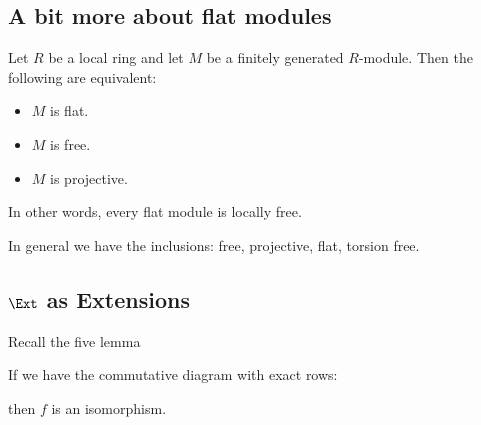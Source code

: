 \documentclass[12pt]{article}
\begin{document}
\subsection{A bit more about flat modules}
\begin{prop}
	Let $R$ be a local ring and let $M$ be a finitely generated $R$-module. Then the following are equivalent:
	\begin{itemize}
		\item $M$ is flat.
		\item $M$ is free.
		\item $M$ is projective.
	\end{itemize}
\end{prop}
\begin{rmk}
	In other words, every flat module is locally free.
\end{rmk}
\begin{rmk}
	In general we have the inclusions: free, projective, flat, torsion free.
\end{rmk}

\subsection{$\Ext$ as Extensions}
Recall the five lemma 
\begin{lem}
	If we have the commutative diagram with exact rows:
	\begin{center}
		then $f$ is an isomorphism.
	\end{center}
\end{lem}
\end{document}
